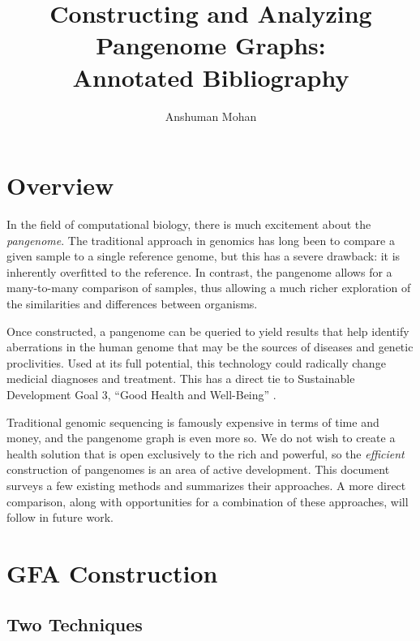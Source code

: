 \documentclass[acmsmall, screen]{acmart}
\begin{document}
\title[Constructing and Analyzing Pangenome Graphs]{Constructing and Analyzing Pangenome Graphs: \\ Annotated Bibliography}
\author{Anshuman Mohan}


\maketitle

\section{Overview}

In the field of computational biology, there is much excitement about the
\emph{pangenome}. The traditional approach in genomics has long been to 
compare a given sample to a single reference genome, but this has a 
severe drawback: it is inherently overfitted to the reference.
In contrast, the pangenome allows for a many-to-many comparison of samples, 
thus allowing a much richer exploration of the similarities and differences
between organisms.

Once constructed, a pangenome can be queried to yield results that help 
identify aberrations in the human genome that may be the sources of diseases and
genetic proclivities. Used at its full potential, this technology could 
radically change medicial diagnoses and treatment. This has a 
direct tie to Sustainable Development Goal 3, ``Good Health and Well-Being'' 
\cite{sdg}.

Traditional genomic sequencing is famously expensive in terms of time and money, 
and the pangenome graph is even more so. We do not wish to create a health
solution that is open exclusively to the rich and powerful,
so the \emph{efficient} construction of 
pangenomes is an area of active development. 
This document surveys a few existing methods and summarizes their approaches. 
A more direct comparison, along with opportunities for a combination of these
approaches, will follow in future work.

\section{GFA Construction}

\subsection{Two Techniques}
\end{document}
